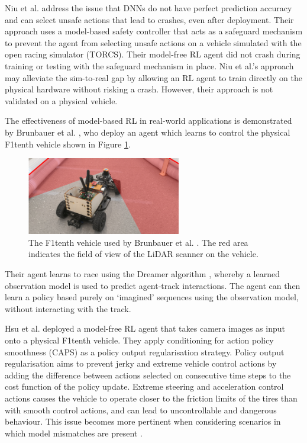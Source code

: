 Niu et al. \cite{Niu2020} address the issue that DNNs do not have perfect prediction accuracy and can select unsafe actions that lead to crashes, even after deployment.
Their approach uses a model-based safety controller that acts as a safeguard mechanism to prevent the agent from selecting unsafe actions on a vehicle simulated with the open racing simulator (TORCS).
Their model-free RL agent did not crash during training or testing with the safeguard mechanism in place.
Niu et al.'s \cite{Niu2020} approach may alleviate the sim-to-real gap by allowing an RL agent to train directly on the physical hardware without risking a crash. 
However, their approach is not validated on a physical vehicle.

The effectiveness of model-based RL in real-world applications is demonstrated by Brunbauer et al. \cite{brunnbauer2021}, who deploy an agent which learns to control the physical F1tenth vehicle shown in Figure \ref{fig:brunbauer}.
\begin{figure}[htb!]
    \centering
    \includegraphics[width=0.6\textwidth]{contents/chapt2/figs/brunnbauer.PNG}
    \caption[The F1tenth vehicle used by Brunbauer]{The F1tenth vehicle used by Brunbauer et al. \cite{brunnbauer2021}. The red area indicates the field of view of the LiDAR scanner on the vehicle.}
    \label{fig:brunbauer}
\end{figure}
Their agent learns to race using the Dreamer algorithm \cite{Hafner2019a}, whereby a learned observation model is used to predict agent-track interactions.
The agent can then learn a policy based purely on `imagined' sequences using the observation model, without interacting with the track.


Hsu et al. \cite{hsu2022} deployed a model-free RL agent that takes camera images as input onto a physical F1tenth vehicle.
They apply conditioning for action policy smoothness (CAPS) \cite{Caps2021} as a policy output regularisation strategy.
Policy output regularisation aims to prevent  jerky and extreme vehicle control actions by adding the difference between actions selected on consecutive time steps to the cost function of the policy update.
Extreme steering and acceleration control actions causes the vehicle to operate closer to the friction limits of the tires than with smooth control actions, and can lead to uncontrollable and dangerous behaviour.
This issue becomes more pertinent when considering scenarios in which model mismatches are present \cite{Chisari2021}.

